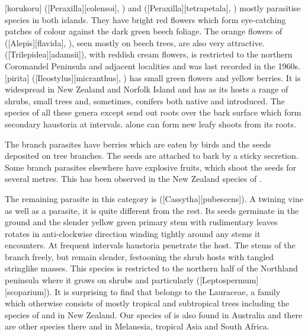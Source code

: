 [korukoru] ([Peraxilla][colensoi], ) and  ([Peraxilla][tetrapetala], ) mostly parasitise  species in both islands.
They have bright red flowers which form eye-catching patches of colour against the dark green beech foliage.
The orange flowers of  ([Alepis][flavida], ), seen mostly on beech trees, are also very attractive.
 ([Trilepidea][adamsii]), with reddish cream flowers, is restricted to the northern Coromandel Peninsula and adjacent localities and was last recorded in the 1960s.
[pirita] ([Ileostylus][micranthus], ) has small green flowers and yellow berries.
It is widespread in New Zealand and Norfolk Island and has as its hosts a range of shrubs, small trees and, sometimes, conifers both native and introduced.
The species of all these genera except  send out roots over the bark surface which form secondary haustoria at intervals.
 alone can form new leafy shoots from its roots.

The branch parasites have berries which are eaten by birds and the seeds deposited on tree branches.
The seeds are attached to bark by a sticky secretion.
Some branch parasites elsewhere have explosive fruits, which shoot the seeds for several metres.
This has been observed in the New Zealand species of .

The remaining parasite in this category is  ([Cassytha][pubescens]).
A twining vine as well as a parasite, it is quite different from the rest.
Its seeds germinate in the ground and the slender yellow green primary stem with rudimentary leaves rotates in anti-clockwise direction winding tightly around any stems it encounters.
At frequent intervals haustoria penetrate the host.
The stems of the  branch freely, but remain slender, festooning the shrub hosts with tangled stringlike masses.
This species is restricted to the northern half of the Northland peninsula where it grows on shrubs and particularly  ([Leptospermum][scoparium]).
It is surprising to find that  belongs to the Lauraceae, a family which otherwise consists of mostly tropical and subtropical trees including the species of  and  in New Zealand.
Our species of  is also found in Australia and there are other species there and in Melanesia, tropical Asia and South Africa.


